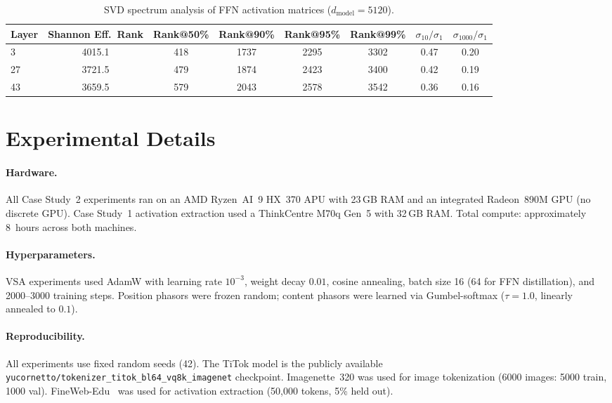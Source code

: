 \documentclass{article}
\begin{document}
\begin{table}[h]
\centering
\caption{SVD spectrum analysis of FFN activation matrices ($d_\text{model}{=}5120$).}
\label{tab:svd_full}
\begin{tabular}{lccccccc}
\toprule
Layer & Shannon Eff.\ Rank & Rank@50\% & Rank@90\% & Rank@95\% & Rank@99\% & $\sigma_{10}/\sigma_1$ & $\sigma_{1000}/\sigma_1$ \\
\midrule
3 & 4015.1 & 418 & 1737 & 2295 & 3302 & 0.47 & 0.20 \\
27 & 3721.5 & 479 & 1874 & 2423 & 3400 & 0.42 & 0.19 \\
43 & 3659.5 & 579 & 2043 & 2578 & 3542 & 0.36 & 0.16 \\
\bottomrule
\end{tabular}
\end{table}

\section{Experimental Details}
\label{app:details}

\paragraph{Hardware.}
All Case Study~2 experiments ran on an AMD Ryzen~AI~9 HX~370 APU with 23\,GB RAM and an integrated Radeon~890M GPU (no discrete GPU).
Case Study~1 activation extraction used a ThinkCentre M70q Gen~5 with 32\,GB RAM.
Total compute: approximately 8~hours across both machines.

\paragraph{Hyperparameters.}
VSA experiments used AdamW with learning rate $10^{-3}$, weight decay $0.01$, cosine annealing, batch size 16 (64 for FFN distillation), and 2000--3000 training steps.
Position phasors were frozen random; content phasors were learned via Gumbel-softmax ($\tau{=}1.0$, linearly annealed to $0.1$).

\paragraph{Reproducibility.}
All experiments use fixed random seeds (42).
The TiTok model is the publicly available \texttt{yucornetto/tokenizer\_titok\_bl64\_vq8k\_imagenet} checkpoint.
Imagenette~320 was used for image tokenization (6000 images: 5000 train, 1000 val).
FineWeb-Edu~\citep{penedo2024fineweb} was used for activation extraction (50{,}000 tokens, 5\% held out).
\end{document}
